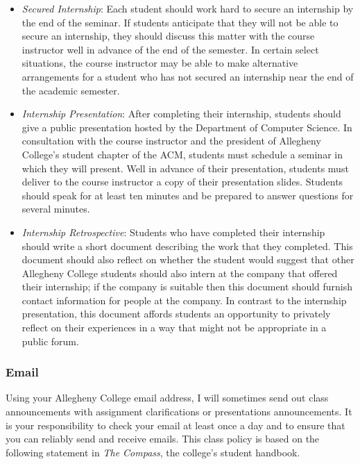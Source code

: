 \begin{itemize}
  \item {\em Secured Internship}: Each student should work hard to secure an internship by the end of the seminar.
    If students anticipate that they will not be able to secure an internship, they should discuss this matter
    with the course instructor well in advance of the end of the semester.  In certain select situations, the
    course instructor may be able to make alternative arrangements for a student who has not secured an internship
    near the end of the academic semester.

  \item {\em Internship Presentation}: After completing their internship, students should give a public presentation
    hosted by the Department of Computer Science. In consultation with the course instructor and the president of
    Allegheny College's student chapter of the ACM, students must schedule a seminar in which they will
    present.  Well in advance of their presentation, students must deliver to the course instructor a copy of their 
    presentation slides.  Students should speak for at least ten minutes and be prepared to answer questions for
    several minutes.     

  \item {\em Internship Retrospective}: Students who have completed their internship should write a short document
    describing the work that they completed.  This document should also reflect on whether the student would suggest
    that other Allegheny College students should also intern at the company that offered their internship;  if the
    company is suitable then this document should furnish contact information for people at the company.  In
    contrast to the internship presentation, this document affords students an opportunity to privately reflect on
    their experiences in a way that might not be appropriate in a public forum.

\end{itemize}

\subsubsection*{Email}

Using your Allegheny College email address, I will sometimes send out class announcements with assignment clarifications
or presentations announcements. It is your responsibility to check your email at least once a day and to ensure that you
can reliably send and receive emails. This class policy is based on the following statement in {\em The Compass}, the
college's student handbook.

